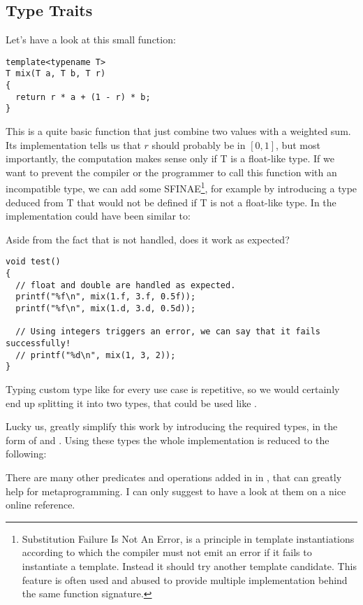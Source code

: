 \subsection{Type Traits}

\problemtitle

Let's have a look at this small function:

\begin{lstlisting}
template<typename T>
T mix(T a, T b, T r)
{
  return r * a + (1 - r) * b;
}
\end{lstlisting}

This is a quite basic function that just combine two values with a
weighted sum. Its implementation tells us that $r$ should probably be
in $[0, 1]$, but most importantly, the computation makes sense only if
T is a float-like type. If we want to prevent the compiler or the
programmer to call this function with an incompatible type, we can add
some SFINAE\footnote{Substitution Failure Is Not An Error, is a
  principle in template instantiations according to which the compiler
  must not emit an error if it fails to instantiate a
  template. Instead it should try another template candidate. This
  feature is often used and abused to provide multiple implementation
  behind the same function signature.}, for example by introducing a
type deduced from T that would not be defined if T is not a float-like
type. In  the implementation could have been similar to:


Aside from the fact that  is not handled, does it
work as expected?

\begin{lstlisting}
void test()
{
  // float and double are handled as expected.
  printf("%f\n", mix(1.f, 3.f, 0.5f));
  printf("%f\n", mix(1.d, 3.d, 0.5d));

  // Using integers triggers an error, we can say that it fails successfully!
  // printf("%d\n", mix(1, 3, 2));
}
\end{lstlisting}

Typing custom type like  for every use
case is repetitive, so we would certainly end up splitting it into two
types, that could be used like
.

\solutiontitle

%
%
Lucky us,  greatly simplify this work by introducing the
required types, in the form of  and
. Using these types the whole
implementation is reduced to the following:


There are many other predicates and operations added in
 in , that can greatly help for
metaprogramming. I can only suggest to have a look at them on a nice
online reference.
